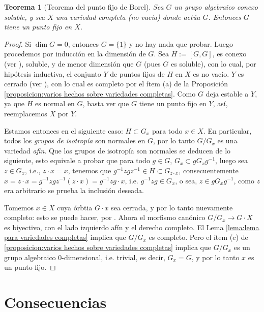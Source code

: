 \documentclass[spanish,10pt]{amsart}
\newtheorem{theorem}{Teorema}[section]
\theoremstyle{definition}
\theoremstyle{remark}
\numberwithin{equation}{section}
\begin{document}
\begin{theorem}[Teorema del punto fijo de Borel]\label{teorema:punto fijo de borel}
Sea $G$ un grupo algebraico conexo soluble, y sea $X$ una variedad completa (no vacía) donde actúa $G$. Entonces $G$ tiene un punto fijo en $X$.
\end{theorem}
\begin{proof}
Si $\dim G = 0$, entonces $G = \{1\}$ y no hay nada que probar. Luego procedemos por inducción en la dimensión de $G$. Sea $H := [G, G]$, es conexo (ver \cite[(17.2)]{humphreys2012linearAlgebraicGroups}), soluble, y de menor dimensión que $G$ (pues $G$ es soluble), con lo cual, por hipótesis inductiva, el conjunto $Y$ de puntos fijos de $H$ en $X$ es no vacío. $Y$ es cerrado (ver \cite[Proposición 8.2.]{humphreys2012linearAlgebraicGroups}), con lo cual es completo por el ítem (a) de la Proposición \ref{proposicion:varios hechos sobre variedades completas}. Como $G$ deja estable a $Y$, ya que $H$ es normal en $G$, basta ver que $G$ tiene un punto fijo en $Y$, así, reemplacemos $X$ por $Y$.

Estamos entonces en el siguiente caso: $H \subset G_x$ para todo $x \in X$. En particular, todos los \textit{grupos de isotropía} son normales en $G$, por lo tanto $G/G_x$ es una variedad \textit{afin}. Que los grupos de isotropía son normales se deducen de lo siguiente, esto equivale a probar que para todo $g \in G$, $G_x \subset g G_x g^{-1}$, luego sea $z \in G_x$, i.e., $z \cdot x = x$, tenemos que $g^{-1}z g z^{-1} \in H \subset G_{z \cdot x}$, consecuentemente $x = z \cdot x = g^{-1} z g z^{-1} (z \cdot x) = g^{-1} z g \cdot x$, i.e. $g ^{-1} z g \in G_x$, o sea, $z \in g G_x g^{-1}$, como $z$ era arbitrario se prueba la inclusión deseada.

Tomemos $x \in X$ cuya órbtia $G \cdot x$ sea cerrada, y por lo tanto nuevamente completo: esto se puede hacer, por \cite[Proposición 8.3.]{humphreys2012linearAlgebraicGroups}. Ahora el morfismo canónico $G / G_x \to G \cdot X$ es biyectivo, con el lado izquierdo afín y el derecho completo. El Lema \ref{lema:lema para variedades completas} implica que $G/G_x$ es completo. Pero el ítem (c) de \ref{proposicion:varios hechos sobre variedades completas} implica que $G/G_x$ es un grupo algebraico $0$-dimensional, i.e. trivial, es decir, $G_x = G$, y por lo tanto $x$ es un punto fijo.
\end{proof}

\section{Consecuencias}
\end{document}

